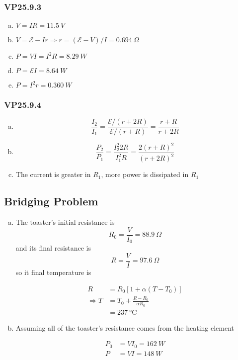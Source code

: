 \documentclass{article}
\begin{document}
\subsubsection{VP25.9.3}

\begin{enumerate}[(a)]
  \item $V = I R = \qty{11.5}{V}$

  \item $V = \mathcal{E} - I r \Rightarrow r = (\mathcal{E} - V) / I = \qty{0.694}{\Omega}$

  \item $P = V I = I^2 R = \qty{8.29}{W}$

  \item $P = \mathcal{E} I = \qty{8.64}{W}$

  \item $P = I^2 r = \qty{0.360}{W}$
\end{enumerate}

\subsubsection{VP25.9.4}

\begin{enumerate}[(a)]
  \item \[\frac{I_2}{I_1} = \frac{\mathcal{E} / (r + 2R)}{\mathcal{E} / (r + R)} = \frac{r + R}{r + 2 R}\]

  \item \[\frac{P_2}{P_1} = \frac{I_2^2 2 R}{I_1^2 R} = \frac{2 (r + R)^2}{(r + 2 R)^2}\]

  \item The current is greater in $R_1$, more power is dissipated in $R_1$
\end{enumerate}

\subsection{Bridging Problem}

\begin{enumerate}[(a)]
  \item The toaster's initial resistance is \[R_0 = \frac{V}{I_0} = \qty{88.9}{\Omega}\] and its final resistance is \[R = \frac{V}{I} = \qty{97.6}{\Omega}\] so it final temperature is

        \begin{align*}
          R             & = R_0 [1 + \alpha (T - T_0)]       \\
          \Rightarrow T & = T_0 + \frac{R - R_0}{\alpha R_0} \\
                        & = \qty{237}{\degreeCelsius}
        \end{align*}

  \item Assuming all of the toaster's resistance comes from the heating element

        \begin{align*}
          P_0 & = V I_0 = \qty{162}{W} \\
          P   & = V I = \qty{148}{W}
        \end{align*}
\end{enumerate}
\end{document}
